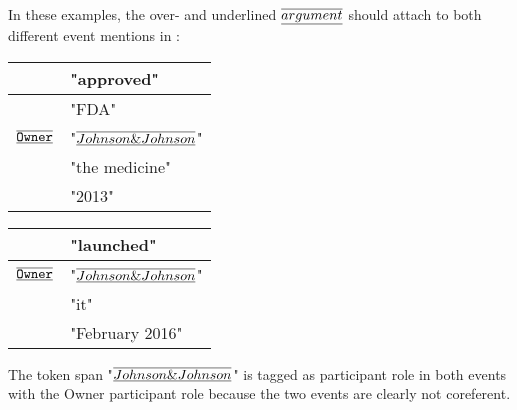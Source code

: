 In these examples, the over- and underlined $\overline{\uline{argument}}$ should attach to both different event mentions in :
\begin{samepage}
\begin{exe}

\ex {} \label{ex:sharedarg1}
    \nopagebreak
    \expl \begin{tabular}{|L{6cm}|L{7cm}|} \hline
         & "approved" \\\hline
         & "FDA" \\
        $\overline{\uline{\type{Owner}}}$ & "$\overline{\uline{Johnson\&Johnson}}$" \\
         & "the medicine" \\
         & "2013" \\
        \hline \end{tabular}
    \expl \begin{tabular}{|L{6cm}|L{7cm}|} \hline
         & "launched" \\\hline
        $\overline{\uline{\type{Owner}}}$ & "$\overline{\uline{Johnson\&Johnson}}$" \\
         & "it" \\
         & "February 2016" \\\hline \end{tabular}
    \expl The token span "$\overline{\uline{Johnson\&Johnson}}$" is tagged as  participant role in both events with the Owner participant role because the two events are clearly not coreferent.
    

\end{exe}
\end{samepage}
